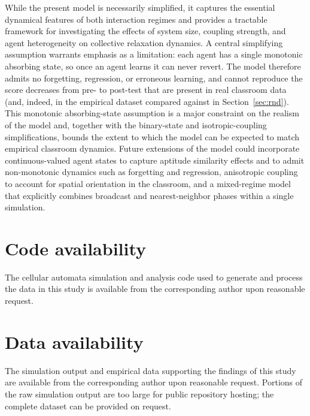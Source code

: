 \documentclass[a4paper,fleqn]{cas-sc}
\begin{document}
While the present model is necessarily simplified, it captures the essential dynamical features of both interaction regimes and provides a tractable framework for investigating the effects of system size, coupling strength, and agent heterogeneity on collective relaxation dynamics.
A central simplifying assumption warrants emphasis as a limitation: each agent has a single monotonic absorbing state, so once an agent learns it can never revert. The model therefore admits no forgetting, regression, or erroneous learning, and cannot reproduce the score decreases from pre- to post-test that are present in real classroom data (and, indeed, in the empirical dataset compared against in Section~\ref{sec:rnd}). This monotonic absorbing-state assumption is a major constraint on the realism of the model and, together with the binary-state and isotropic-coupling simplifications, bounds the extent to which the model can be expected to match empirical classroom dynamics.
Future extensions of the model could incorporate continuous-valued agent states to capture aptitude similarity effects and to admit non-monotonic dynamics such as forgetting and regression, anisotropic coupling to account for spatial orientation in the classroom, and a mixed-regime model that explicitly combines broadcast and nearest-neighbor phases within a single simulation.

\section*{Code availability}
The cellular automata simulation and analysis code used to generate and process the data in this study is available from the corresponding author upon reasonable request.

\section*{Data availability}
The simulation output and empirical data supporting the findings of this study are available from the corresponding author upon reasonable request. Portions of the raw simulation output are too large for public repository hosting; the complete dataset can be provided on request.

\end{document}
